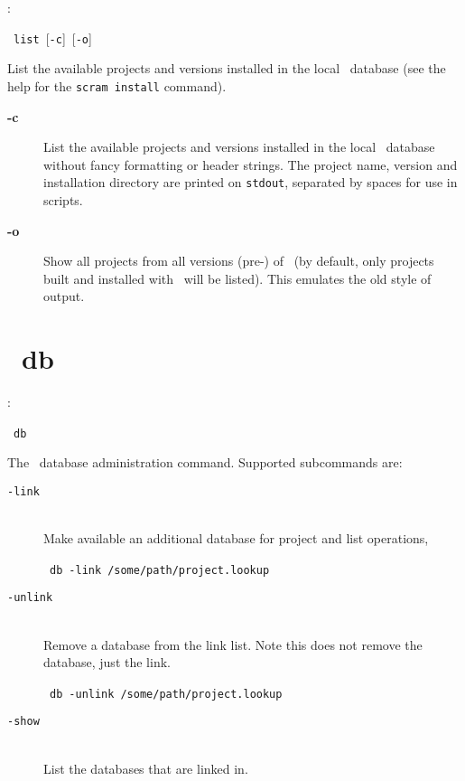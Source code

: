 \cmdintro:

\hspace{5mm}\scram~\texttt{list}~[\texttt{-c}]~[\texttt{-o}]~

\ni List the available projects and versions installed in the
local \scram\ database (see the help for the \texttt{scram install} command).

\begin{description}
\item[\textbf{-c}]
  List the available projects and versions installed in the local
  \scram\ database without fancy formatting or header strings. The
  project name, version and installation directory are printed on \texttt{stdout}, separated
  by spaces for use in scripts.
\item[\textbf{-o}]
  Show all projects from all versions (\ie pre-\scramvx)
  of \scram\ (by default, only projects built and installed with
  \scramvx\ will be listed). This emulates the old style of output.
\end{description}

\section{\scram\ db}

\cmdintro:

\hspace{5mm}\scram~\texttt{db}~ 

\ni The \scram\ database administration command. Supported subcommands are:

\begin{description}
\item[\texttt{-link}]\mbox{}\\
  Make available an additional database for project and
  list operations, \eg
  
  \hspace{15mm}\scram~\texttt{db}~\texttt{-link}~\texttt{/some/path/project.lookup}
  
\item[\texttt{-unlink}]\mbox{}\\
  Remove a database from the link list. Note this does
  not remove the database, just the link.
  
  \hspace{15mm}\scram~\texttt{db}~\texttt{-unlink}~\texttt{/some/path/project.lookup}
  
\item[\texttt{-show}]\mbox{}\\
  List the databases that are linked in.
\end{description}



